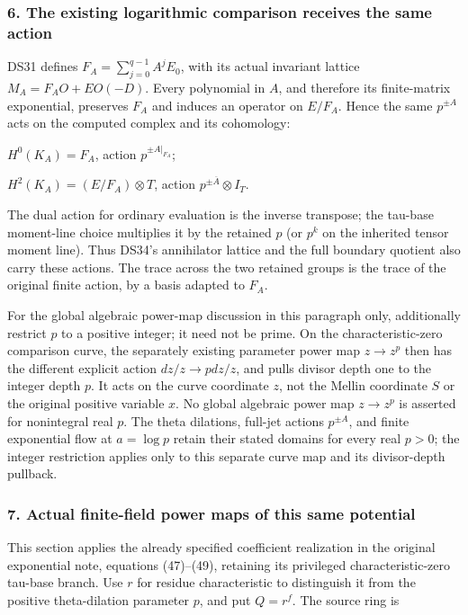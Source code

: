 \documentclass{article}
\begin{document}
\subsubsection{6. The existing logarithmic comparison receives the same action}\label{endpoint-f1_scaling--the-existing-logarithmic-comparison-receives-the-same-action}

DS31 defines \(F_A=\sum_{j=0}^{q-1}A^j E_0\), with its actual invariant lattice \(M_A=F_A O+E O(-D)\). Every polynomial in \(A\), and therefore its finite-matrix exponential, preserves \(F_A\) and induces an operator on \(E/F_A\). Hence the same \(p^{\pm A}\) acts on the computed complex and its cohomology:

\(H^0(K_A)=F_A\), action \(p^{\pm\left.A\right|_{F_A}}\);

\(H^2(K_A)=(E/F_A) \otimes T\), action \(p^{\pm\overline A}\otimes I_T\).

The dual action for ordinary evaluation is the inverse transpose; the tau-base moment-line choice multiplies it by the retained \(p\) (or \(p^k\) on the inherited tensor moment line). Thus DS34's annihilator lattice and the full boundary quotient also carry these actions. The trace across the two retained groups is the trace of the original finite action, by a basis adapted to \(F_A\).

For the global algebraic power-map discussion in this paragraph only, additionally restrict \(p\) to a positive integer; it need not be prime. On the characteristic-zero comparison curve, the separately existing parameter power map \(z\to z^p\) then has the different explicit action \(dz/z \to  p dz/z\), and pulls divisor depth one to the integer depth \(p\). It acts on the curve coordinate \(z\), not the Mellin coordinate \(S\) or the original positive variable \(x\). No global algebraic power map \(z\to z^p\) is asserted for nonintegral real \(p\). The theta dilations, full-jet actions \(p^{\pm A}\), and finite exponential flow at \(a=\log p\) retain their stated domains for every real \(p>0\); the integer restriction applies only to this separate curve map and its divisor-depth pullback.

\subsubsection{7. Actual finite-field power maps of this same potential}\label{endpoint-f1_scaling--actual-finite-field-power-maps-of-this-same-potential}

This section applies the already specified coefficient realization in the original exponential note, equations (47)--(49), retaining its privileged characteristic-zero tau-base branch. Use \(r\) for residue characteristic to distinguish it from the positive theta-dilation parameter \(p\), and put \(Q=r^f\). The source ring is
\end{document}
